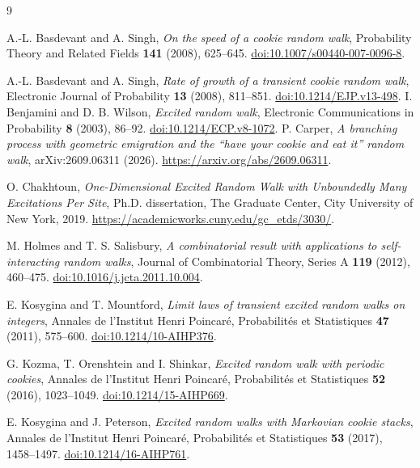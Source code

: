 \documentclass[11pt]{amsart}
\numberwithin{equation}{section}
\theoremstyle{remark}
\begin{document}
\begin{thebibliography}{9}

A.-L. Basdevant and A. Singh,
\emph{On the speed of a cookie random walk},
Probability Theory and Related Fields \textbf{141} (2008), 625--645.
\href{https://doi.org/10.1007/s00440-007-0096-8}{doi:10.1007/s00440-007-0096-8}.

A.-L. Basdevant and A. Singh,
\emph{Rate of growth of a transient cookie random walk},
Electronic Journal of Probability \textbf{13} (2008), 811--851.
\href{https://doi.org/10.1214/EJP.v13-498}{doi:10.1214/EJP.v13-498}.
I. Benjamini and D. B. Wilson,
\emph{Excited random walk},
Electronic Communications in Probability \textbf{8} (2003), 86--92.
\href{https://doi.org/10.1214/ECP.v8-1072}{doi:10.1214/ECP.v8-1072}.
P. Carper,
\emph{A branching process with geometric emigration and the ``have your cookie and eat it'' random walk},
arXiv:2609.06311 (2026).
\url{https://arxiv.org/abs/2609.06311}.

O. Chakhtoun,
\emph{One-Dimensional Excited Random Walk with Unboundedly Many Excitations Per Site},
Ph.D. dissertation, The Graduate Center, City University of New York, 2019.
\url{https://academicworks.cuny.edu/gc_etds/3030/}.

M. Holmes and T. S. Salisbury,
\emph{A combinatorial result with applications to self-interacting random walks},
Journal of Combinatorial Theory, Series A \textbf{119} (2012), 460--475.
\href{https://doi.org/10.1016/j.jcta.2011.10.004}{doi:10.1016/j.jcta.2011.10.004}.

E. Kosygina and T. Mountford,
\emph{Limit laws of transient excited random walks on integers},
Annales de l'Institut Henri Poincar\'e, Probabilit\'es et Statistiques \textbf{47} (2011), 575--600.
\href{https://doi.org/10.1214/10-AIHP376}{doi:10.1214/10-AIHP376}.

G. Kozma, T. Orenshtein and I. Shinkar,
\emph{Excited random walk with periodic cookies},
Annales de l'Institut Henri Poincar\'e, Probabilit\'es et Statistiques \textbf{52} (2016), 1023--1049.
\href{https://doi.org/10.1214/15-AIHP669}{doi:10.1214/15-AIHP669}.

E. Kosygina and J. Peterson,
\emph{Excited random walks with Markovian cookie stacks},
Annales de l'Institut Henri Poincar\'e, Probabilit\'es et Statistiques \textbf{53} (2017), 1458--1497.
\href{https://doi.org/10.1214/16-AIHP761}{doi:10.1214/16-AIHP761}.


\end{thebibliography}
\end{document}
